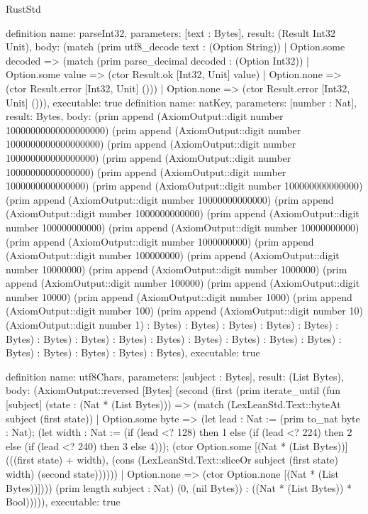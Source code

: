 \begin{lexlean}{RustStd}
\begin{semanticmodule}
definition{
  name: parseInt32,
  parameters: [text : Bytes],
  result: (Result Int32 Unit),
  body: (match (prim utf8_decode text : (Option String)) | Option.some decoded => (match (prim parse_decimal decoded : (Option Int32)) | Option.some value => (ctor Result.ok [Int32, Unit] value) | Option.none => (ctor Result.error [Int32, Unit] ())) | Option.none => (ctor Result.error [Int32, Unit] ())),
  executable: true
}
definition{
  name: natKey,
  parameters: [number : Nat],
  result: Bytes,
  body: (prim append (AxiomOutput::digit number 10000000000000000000) (prim append (AxiomOutput::digit number 1000000000000000000) (prim append (AxiomOutput::digit number 100000000000000000) (prim append (AxiomOutput::digit number 10000000000000000) (prim append (AxiomOutput::digit number 1000000000000000) (prim append (AxiomOutput::digit number 100000000000000) (prim append (AxiomOutput::digit number 10000000000000) (prim append (AxiomOutput::digit number 1000000000000) (prim append (AxiomOutput::digit number 100000000000) (prim append (AxiomOutput::digit number 10000000000) (prim append (AxiomOutput::digit number 1000000000) (prim append (AxiomOutput::digit number 100000000) (prim append (AxiomOutput::digit number 10000000) (prim append (AxiomOutput::digit number 1000000) (prim append (AxiomOutput::digit number 100000) (prim append (AxiomOutput::digit number 10000) (prim append (AxiomOutput::digit number 1000) (prim append (AxiomOutput::digit number 100) (prim append (AxiomOutput::digit number 10) (AxiomOutput::digit number 1) : Bytes) : Bytes) : Bytes) : Bytes) : Bytes) : Bytes) : Bytes) : Bytes) : Bytes) : Bytes) : Bytes) : Bytes) : Bytes) : Bytes) : Bytes) : Bytes) : Bytes) : Bytes) : Bytes),
  executable: true
}

definition{
  name: utf8Chars,
  parameters: [subject : Bytes],
  result: (List Bytes),
  body: (AxiomOutput::reversed [Bytes] (second (first (prim iterate_until (fun [subject] (state : (Nat * (List Bytes))) => (match (LexLeanStd.Text::byteAt subject (first state)) | Option.some byte => (let lead : Nat := (prim to_nat byte : Nat); (let width : Nat := (if (lead <? 128) then 1 else (if (lead <? 224) then 2 else (if (lead <? 240) then 3 else 4))); (ctor Option.some [(Nat * (List Bytes))] (((first state) + width), (cons (LexLeanStd.Text::sliceOr subject (first state) width) (second state)))))) | Option.none => (ctor Option.none [(Nat * (List Bytes))]))) (prim length subject : Nat) (0, (nil Bytes)) : ((Nat * (List Bytes)) * Bool))))),
  executable: true
}


\end{semanticmodule}
\end{lexlean}
